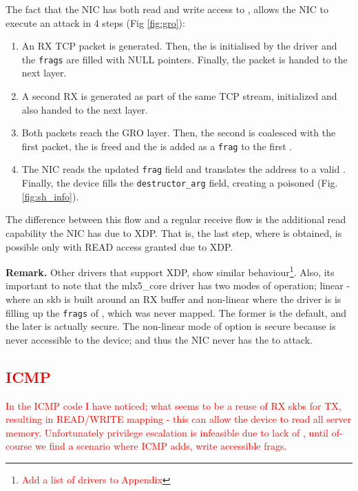 The fact that the NIC has both read and write access to \shinfo, allows the NIC to execute an attack in 4 steps (Fig \ref{fig:gro}):
\begin{enumerate}
    \item An RX TCP packet is generated. Then, the \shinfo{} is initialised by the driver and the \texttt{frags} are filled with NULL pointers. Finally, the packet is handed to the next layer.
    
    \item A second RX \skb{} is generated as part of the same TCP stream, initialized and also handed to the next layer.
    
    \item Both packets reach the GRO layer. Then, the second \skb{} is coalesced with the first packet, the \skb{} is freed and the \data{} is added as a \texttt{frag} to the first \skb.
    
    \item The NIC reads the updated \texttt{frag} field and translates the \page{} address to a valid \kva{}. Finally, the device fills the \texttt{destructor\_arg} field, creating a poisoned \skb{} (Fig. \ref{fig:sh_info}).
\end{enumerate}

The difference between this flow and a regular receive flow is the additional read capability the NIC has due to XDP. That is, the last step, where \means{} is obtained, is possible only with READ access granted due to XDP.

\smallskip
\noindent\textbf{Remark.} Other drivers that support XDP, show similar behaviour\footnote{\textcolor{red}{Add a list of drivers to Appendix}}. Also, its important to note that the mlx5\_core driver has two modes of operation; linear - where an skb is built around an RX buffer and non-linear where the driver is is filling up the \texttt{frags} of \shinfo, which was never mapped. The former is the default, and the later is actually secure. The non-linear mode of option is secure because \shinfo{} is never accessible to the device; and thus the NIC never has the \oportunity{} to attack.


\textcolor{red}{\subsection{ICMP}
In the ICMP code I have noticed; what seems to be a reuse of RX skbs for TX, resulting in READ/WRITE mapping - this can allow the device to read all server memory. Unfortunately privilege escalation is infeasible due to lack of \means, until of-course we find a scenario where ICMP adds, write accessible frags.} 

